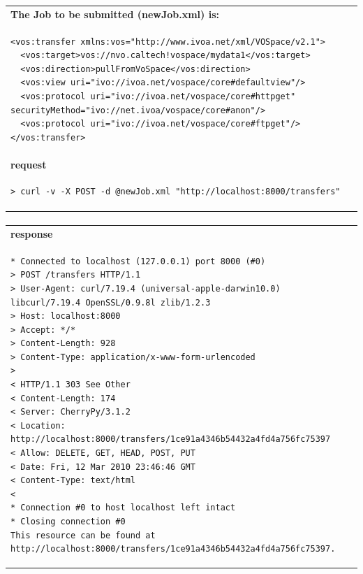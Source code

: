 \documentclass[11pt,a4paper]{ivoa}
\begin{document}
\begin{tabular}{ p{10cm} }
\\
\textbf{The Job to be submitted (newJob.xml) is:} \\
\begin{lstlisting}
<vos:transfer xmlns:vos="http://www.ivoa.net/xml/VOSpace/v2.1">
  <vos:target>vos://nvo.caltech!vospace/mydata1</vos:target>
  <vos:direction>pullFromVoSpace</vos:direction>
  <vos:view uri="ivo://ivoa.net/vospace/core#defaultview"/>
  <vos:protocol uri="ivo://ivoa.net/vospace/core#httpget" securityMethod="ivo://net.ivoa/vospace/core#anon"/>
  <vos:protocol uri="ivo://ivoa.net/vospace/core#ftpget"/>
</vos:transfer>
\end{lstlisting} \\
\textbf{request} \\
\begin{lstlisting}
> curl -v -X POST -d @newJob.xml "http://localhost:8000/transfers"
\end{lstlisting} \\
\end{tabular}
\paragraph{}
\begin{tabular}{ p{10cm} }
\textbf{response} \\
\begin{lstlisting}
* Connected to localhost (127.0.0.1) port 8000 (#0)
> POST /transfers HTTP/1.1
> User-Agent: curl/7.19.4 (universal-apple-darwin10.0) libcurl/7.19.4 OpenSSL/0.9.8l zlib/1.2.3
> Host: localhost:8000
> Accept: */*
> Content-Length: 928
> Content-Type: application/x-www-form-urlencoded
> 
< HTTP/1.1 303 See Other
< Content-Length: 174
< Server: CherryPy/3.1.2
< Location: http://localhost:8000/transfers/1ce91a4346b54432a4fd4a756fc75397
< Allow: DELETE, GET, HEAD, POST, PUT
< Date: Fri, 12 Mar 2010 23:46:46 GMT
< Content-Type: text/html
< 
* Connection #0 to host localhost left intact
* Closing connection #0
This resource can be found at http://localhost:8000/transfers/1ce91a4346b54432a4fd4a756fc75397.
\end{lstlisting} \\
\end{tabular}
\end{document}
